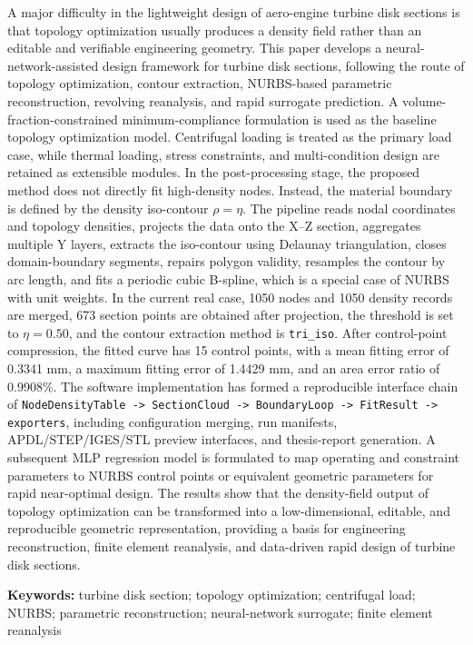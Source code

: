 \documentclass{FRB-style}
\newcommand{\codepath}[1]{\texttt{#1}}
\begin{document}
A major difficulty in the lightweight design of aero-engine turbine disk sections is that topology optimization usually produces a density field rather than an editable and verifiable engineering geometry. This paper develops a neural-network-assisted design framework for turbine disk sections, following the route of topology optimization, contour extraction, NURBS-based parametric reconstruction, revolving reanalysis, and rapid surrogate prediction. A volume-fraction-constrained minimum-compliance formulation is used as the baseline topology optimization model. Centrifugal loading is treated as the primary load case, while thermal loading, stress constraints, and multi-condition design are retained as extensible modules. In the post-processing stage, the proposed method does not directly fit high-density nodes. Instead, the material boundary is defined by the density iso-contour $\rho=\eta$. The pipeline reads nodal coordinates and topology densities, projects the data onto the X--Z section, aggregates multiple Y layers, extracts the iso-contour using Delaunay triangulation, closes domain-boundary segments, repairs polygon validity, resamples the contour by arc length, and fits a periodic cubic B-spline, which is a special case of NURBS with unit weights. In the current real case, 1050 nodes and 1050 density records are merged, 673 section points are obtained after projection, the threshold is set to $\eta=0.50$, and the contour extraction method is \codepath{tri\_iso}. After control-point compression, the fitted curve has 15 control points, with a mean fitting error of 0.3341 mm, a maximum fitting error of 1.4429 mm, and an area error ratio of 0.9908\%. The software implementation has formed a reproducible interface chain of \codepath{NodeDensityTable -> SectionCloud -> BoundaryLoop -> FitResult -> exporters}, including configuration merging, run manifests, APDL/STEP/IGES/STL preview interfaces, and thesis-report generation. A subsequent MLP regression model is formulated to map operating and constraint parameters to NURBS control points or equivalent geometric parameters for rapid near-optimal design. The results show that the density-field output of topology optimization can be transformed into a low-dimensional, editable, and reproducible geometric representation, providing a basis for engineering reconstruction, finite element reanalysis, and data-driven rapid design of turbine disk sections.

\noindent\textbf{Keywords:} turbine disk section; topology optimization; centrifugal load; NURBS; parametric reconstruction; neural-network surrogate; finite element reanalysis
\end{document}
